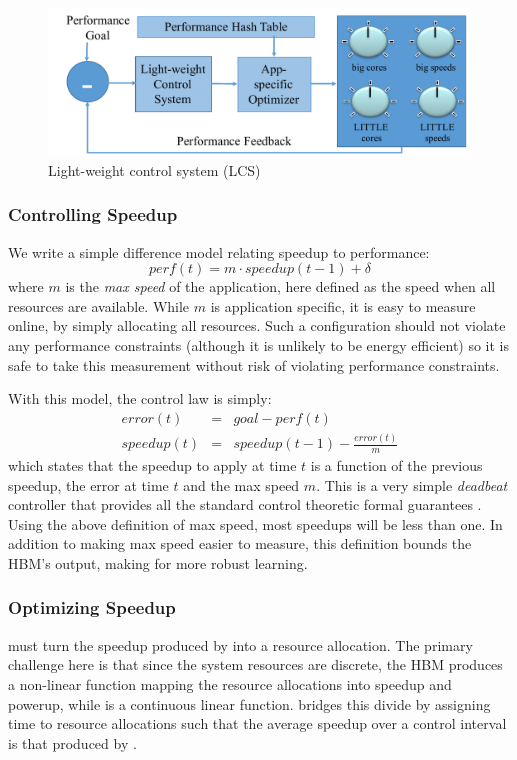 \begin{figure}
\includegraphics[width=\columnwidth]{figures/LCS.pdf}
\caption{Light-weight control system (LCS) }
  \label{fig:framework:lcs}
\end{figure}


\subsubsection{Controlling Speedup}
We write a simple difference model relating speedup to performance:
\begin{equation}
  perf(t) = m \cdot speedup(t-1) + \delta \label{eqn:speedup}
\end{equation}
where $m$ is the \emph{max speed} of the application, here defined as
the speed when all resources are available.  While $m$ is application
specific, it is easy to measure online, by simply allocating all
resources. Such a configuration should not violate any performance
constraints (although it is unlikely to be energy efficient) so it is
safe to take this measurement without risk of violating performance
constraints.

With this model, the control law is simply:
\begin{eqnarray}
  error(t) &=& goal - perf(t) \label{eqn:speedup-error} \\
  speedup(t) &=& speedup(t-1) - \frac{error(t)}{m}
  \label{eqn:speedup-control}
\end{eqnarray}
which states that the speedup to apply at time $t$ is a function of
the previous speedup, the error at time $t$ and the max speed $m$.
This is a very simple \emph{deadbeat} controller that provides all the
standard control theoretic formal guarantees \cite{Hellerstein2004a}.
Using the above definition of max speed, most speedups will be less
than one.  In addition to making max speed easier to measure, this
definition bounds the HBM's output, making for more robust learning.

\subsubsection{Optimizing Speedup}
\SYSTEM{} must turn the speedup produced by 
into a resource allocation.  The primary challenge here is that since
the system resources are discrete, the HBM produces a non-linear
function mapping the resource allocations into speedup and powerup,
while  is a continuous linear function.
\SYSTEM{} bridges this divide by assigning time to resource
allocations such that the average speedup over a control interval is
that produced by .

